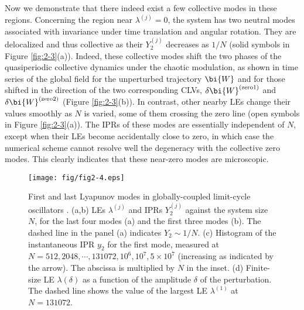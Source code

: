 \documentclass[12pt]{iopart}
\begin{document}
Now we demonstrate that
 there indeed exist a few collective modes in these regions.
Concerning the region near $\lambda^{(j)} = 0$,
 the system has two neutral modes associated with invariance
 under time translation and angular rotation.
They are delocalized and thus collective
 as their $Y_2^{(j)}$ decreases as $1/N$
 (solid symbols in Figure \ref{fig:2-3}(a)).
Indeed, these collective modes shift the two phases
 of the quasiperiodic collective dynamics under the chaotic modulation,
 as shown in time series of the global field for the unperturbed trajectory
 $\bi{W}$ and for those shifted in the direction of the two corresponding CLVs,
 $\delta\bi{W}^{\mathrm{(zero1)}}$ and $\delta\bi{W}^{\mathrm{(zero2)}}$
 (Figure \ref{fig:2-3}(b)).
In contrast, other nearby LEs change their values smoothly as $N$ is varied,
 some of them crossing the zero line
 (open symbols in Figure \ref{fig:2-3}(a)).
The IPRs of these modes are essentially independent of $N$,
 except when their LEs become accidentally close to zero,
 in which case the numerical scheme cannot resolve well
 the degeneracy with the collective zero modes.
This clearly indicates that these near-zero modes are microscopic.

\begin{figure}[t]
 \begin{center}
  \texttt{[image: fig/fig2-4.eps]}
  \caption{First and last Lyapunov modes in globally-coupled limit-cycle oscillators . (a,b) LEs $\lambda^{(j)}$ and IPRs $Y_2^{(j)}$ against the system size $N$, for the last four modes (a) and the first three modes (b). The dashed line in the panel (a) indicates $Y_2 \sim 1/N$. (c) Histogram of the instantaneous IPR $y_2$ for the first mode, measured at $N = 512, 2048, \cdots, 131072, 10^6, 10^7, 5 \times 10^7$ (increasing as indicated by the arrow). The abscissa is multiplied by $N$ in the inset. (d) Finite-size LE $\lambda(\delta)$ as a function of the amplitude $\delta$ of the perturbation. The dashed line shows the value of the largest LE $\lambda^{(1)}$ at $N=131072$.}
  \label{fig:2-4}
 \end{center}
\end{figure}%
\end{document}
